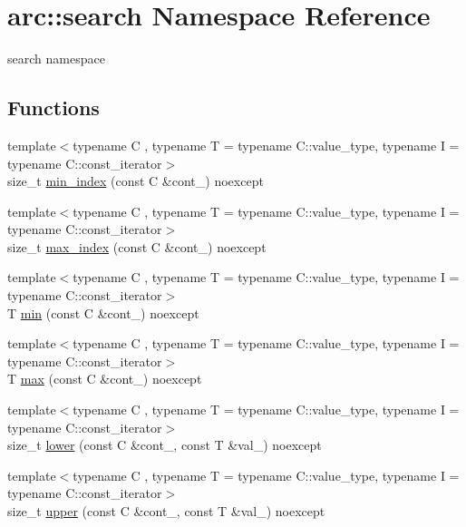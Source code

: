 \hypertarget{namespacearc_1_1search}{}\section{arc\+:\+:search Namespace Reference}
\label{namespacearc_1_1search}


search namespace  


\subsection*{Functions}
\begin{DoxyCompactItemize}
\item 
{\footnotesize template$<$typename C , typename T  = typename C\+::value\+\_\+type, typename I  = typename C\+::const\+\_\+iterator$>$ }\\size\+\_\+t \mbox{\hyperlink{namespacearc_1_1search_ae457da2cc210e1edfaf811bc83154f4b}{min\+\_\+index}} (const C \&cont\+\_\+) noexcept
\item 
{\footnotesize template$<$typename C , typename T  = typename C\+::value\+\_\+type, typename I  = typename C\+::const\+\_\+iterator$>$ }\\size\+\_\+t \mbox{\hyperlink{namespacearc_1_1search_aac33af22b716309501eaa7f5a10cc1d0}{max\+\_\+index}} (const C \&cont\+\_\+) noexcept
\item 
{\footnotesize template$<$typename C , typename T  = typename C\+::value\+\_\+type, typename I  = typename C\+::const\+\_\+iterator$>$ }\\T \mbox{\hyperlink{namespacearc_1_1search_a1cf0173ae1f8475d3b1652c006d5649d}{min}} (const C \&cont\+\_\+) noexcept
\item 
{\footnotesize template$<$typename C , typename T  = typename C\+::value\+\_\+type, typename I  = typename C\+::const\+\_\+iterator$>$ }\\T \mbox{\hyperlink{namespacearc_1_1search_ab5608d27962c637137d2c243213fa366}{max}} (const C \&cont\+\_\+) noexcept
\item 
{\footnotesize template$<$typename C , typename T  = typename C\+::value\+\_\+type, typename I  = typename C\+::const\+\_\+iterator$>$ }\\size\+\_\+t \mbox{\hyperlink{namespacearc_1_1search_ab5171637f0c917d6f387cb619a319ab5}{lower}} (const C \&cont\+\_\+, const T \&val\+\_\+) noexcept
\item 
{\footnotesize template$<$typename C , typename T  = typename C\+::value\+\_\+type, typename I  = typename C\+::const\+\_\+iterator$>$ }\\size\+\_\+t \mbox{\hyperlink{namespacearc_1_1search_a66f5d701ff409cb5e2673a4d5864cd11}{upper}} (const C \&cont\+\_\+, const T \&val\+\_\+) noexcept
\end{DoxyCompactItemize}


